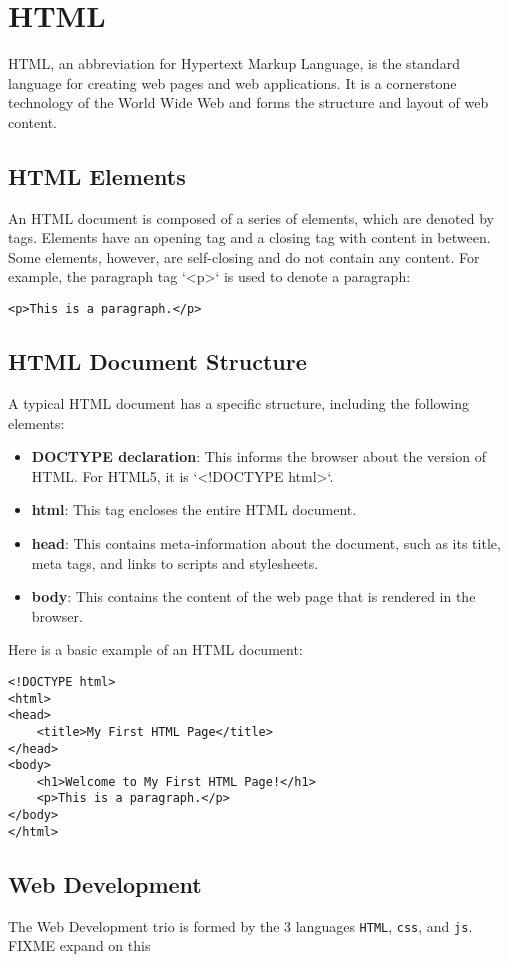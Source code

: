 \chapter{HTML}

HTML, an abbreviation for Hypertext Markup Language, is the standard
language for creating web pages and web applications. It is a
cornerstone technology of the World Wide Web and forms the structure
and layout of web content.

\section{HTML Elements}
An HTML document is composed of a series of elements, which are
denoted by tags. Elements have an opening tag and a closing tag with
content in between. Some elements, however, are self-closing and do
not contain any content. For example, the paragraph tag `<p>` is used
to denote a paragraph:

\begin{verbatim}
<p>This is a paragraph.</p>
\end{verbatim}

\section{HTML Document Structure}
A typical HTML document has a specific structure, including the following elements:

\begin{itemize}
    \item \textbf{DOCTYPE declaration}: This informs the browser about
      the version of HTML. For HTML5, it is `<!DOCTYPE html>`.
    \item \textbf{html}: This tag encloses the entire HTML document.
    \item \textbf{head}: This contains meta-information about the
      document, such as its title, meta tags, and links to scripts and
      stylesheets.
    \item \textbf{body}: This contains the content of the web page
      that is rendered in the browser.
\end{itemize}

Here is a basic example of an HTML document:

\begin{verbatim}
<!DOCTYPE html>
<html>
<head>
    <title>My First HTML Page</title>
</head>
<body>
    <h1>Welcome to My First HTML Page!</h1>
    <p>This is a paragraph.</p>
</body>
</html>
\end{verbatim}

\section{Web Development}
The Web Development trio is formed by the 3 languages \verb|HTML|, \verb|css|, and \verb|js|. 
FIXME expand on this
